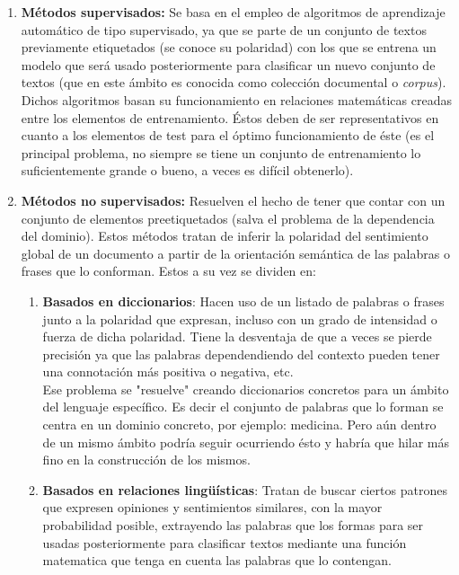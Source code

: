 \documentclass[a4paper,12pt]{report}
\begin{document}
\begin{enumerate}

\item \textbf{Métodos supervisados:} Se basa en el empleo de algoritmos de aprendizaje automático de tipo supervisado, ya que se parte de un conjunto de textos previamente etiquetados (se conoce su polaridad) con los que se entrena un modelo que será usado posteriormente para clasificar un nuevo conjunto de textos (que en este ámbito es conocida como colección documental o \textit{corpus}). 
\vspace{2mm}\\
Dichos algoritmos basan su funcionamiento en relaciones matemáticas creadas entre los elementos de entrenamiento. Éstos deben de ser representativos en cuanto a los elementos de test para el óptimo funcionamiento de éste (es el principal problema, no siempre se tiene un conjunto de entrenamiento lo suficientemente grande o bueno, a veces es difícil obtenerlo).


\item \textbf{Métodos no supervisados:} Resuelven el hecho de tener que contar con un conjunto de elementos preetiquetados (salva el problema de la dependencia del dominio). Estos métodos tratan de inferir la polaridad del sentimiento global de un documento a partir de la orientación semántica de las palabras o frases que lo conforman. Estos a su vez se dividen en: 

	\begin{enumerate}

	\item \textbf{Basados en diccionarios}: Hacen uso de un listado de palabras o frases junto a la polaridad que expresan, incluso con un grado de intensidad o fuerza de dicha polaridad. Tiene la desventaja de que a veces se pierde precisión ya que las palabras dependendiendo del contexto pueden tener una connotación más positiva o negativa, etc.
	\vspace{2mm}\\
	Ese problema se "resuelve" creando diccionarios concretos para un ámbito del lenguaje específico. Es decir el conjunto de palabras que lo forman se centra en un dominio concreto, por ejemplo: medicina. Pero aún dentro de un mismo ámbito podría seguir ocurriendo ésto y habría que hilar más fino en la construcción de los mismos.
	
	\item \textbf{Basados en relaciones lingüísticas}: Tratan de buscar ciertos patrones que expresen opiniones y sentimientos similares, con la mayor probabilidad posible, extrayendo las palabras que los formas para ser usadas posteriormente para clasificar textos mediante una función matematica que tenga en cuenta las palabras que lo contengan. 

	\end{enumerate}

\end{enumerate}
\end{document}
